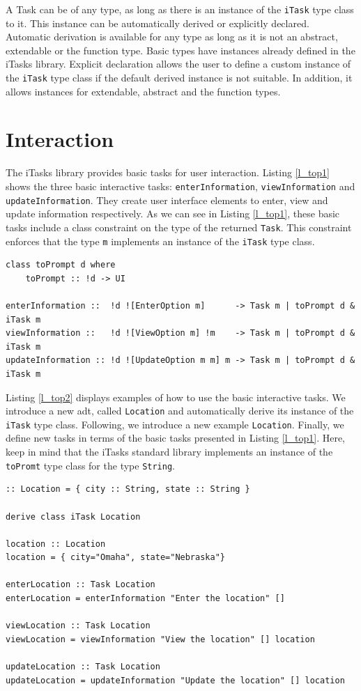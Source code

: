 A Task can be of any type, as long as there is an instance of the \texttt{iTask} type class to it. This instance can be automatically derived or explicitly declared. Automatic derivation is available for any type as long as it is not an abstract, extendable or the function type. Basic types have instances already defined in the iTasks library. Explicit declaration allows the user to define a custom instance of the \texttt{iTask} type class if the default derived instance is not suitable. In addition, it allows instances for extendable, abstract and the function types. 

\section{Interaction}\label{interaction}

The iTasks library provides basic tasks for user interaction. Listing \ref{l_top1} shows the three basic interactive tasks: \texttt{enterInformation}, \texttt{viewInformation} and \texttt{updateInformation}. They create user interface elements to enter, view and update information respectively. As we can see in Listing \ref{l_top1}, these basic tasks include a class constraint on the type of the returned \texttt{Task}. This constraint enforces that the type \texttt{m} implements an instance of the \texttt{iTask} type class. 

\begin{lstlisting}[caption=iTasks basic interaction functions,captionpos=b,label=l_top1]
class toPrompt d where
    toPrompt :: !d -> UI

enterInformation ::  !d ![EnterOption m]      -> Task m | toPrompt d & iTask m
viewInformation ::   !d ![ViewOption m] !m    -> Task m | toPrompt d & iTask m
updateInformation :: !d ![UpdateOption m m] m -> Task m | toPrompt d & iTask m 
\end{lstlisting}


Listing \ref{l_top2} displays examples of how to use the basic interactive tasks. We introduce a new \ac{adt}, called \texttt{Location} and automatically derive its instance of the \texttt{iTask} type class. Following, we introduce a new example \texttt{Location}. Finally, we define new tasks in terms of the basic tasks presented in Listing \ref{l_top1}. Here, keep in mind that the iTasks standard library implements an instance of the \texttt{toPromt} type class for the type \texttt{String}.  


\begin{lstlisting}[caption=Example of basic iTask interaction functions,captionpos=b,label=l_top2]
:: Location = { city :: String, state :: String }

derive class iTask Location

location :: Location
location = { city="Omaha", state="Nebraska"}

enterLocation :: Task Location
enterLocation = enterInformation "Enter the location" []

viewLocation :: Task Location
viewLocation = viewInformation "View the location" [] location

updateLocation :: Task Location
updateLocation = updateInformation "Update the location" [] location
\end{lstlisting}

